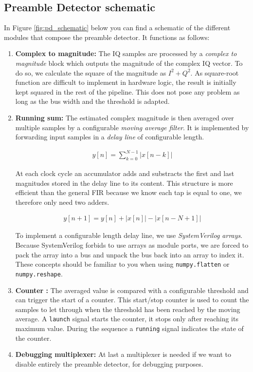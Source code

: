 \subsection{Preamble Detector schematic}
In Figure \ref{fig:pd_schematic} below you can find a schematic of the different modules that compose the preamble detector. It functions as follows:
\begin{enumerate}
    \item \textbf{Complex to magnitude: } The IQ samples are processed by a \textit{complex to magnitude} block which outputs the magnitude of the complex IQ vector.
    To do so, we calculate the square of the magnitude as $I^2+Q^2$. As square-root function are difficult to implement in hardware logic, the result is initially kept squared in the rest of the pipeline. This does not pose any problem as long as the bus width and the threshold is adapted.
    
    \item \textbf{Running sum: } The estimated complex magnitude is then averaged over multiple samples by a configurable \textit{moving average filter}. It is implemented by forwarding input samples in a \textit{delay line} of configurable length.

    \begin{align}
            y[n] = \sum_{k=0}^{N-1}\left|x[n-k]\right|
    \end{align}
        
    At each clock cycle an accumulator adds and substracts the first and last magnitudes stored in the delay line to its content. This structure is more efficient than the general FIR because we know each tap is equal to one, we therefore only need two adders.
        
    \begin{align}
            y[n+1] = y[n] + \left|x[n]\right| - \left|x[n-N+1]\right|
    \end{align}
        
    To implement a configurable length delay line, we use \textit{SystemVerilog arrays}. Because SystemVerilog forbids to use arrays as module ports, we are forced to pack the array into a bus and unpack the bus back into an array to index it. These concepts should be familiar to you when using \texttt{numpy.flatten} or \texttt{numpy.reshape}. 
    
    \item \textbf{Counter :} The averaged value is compared with a configurable threshold and can trigger the start of a counter. This start/stop counter is used to count the samples to let through when the threshold has been reached by the moving average. A \texttt{launch} signal starts the counter, it stops only after reaching its maximum value. During the sequence a \texttt{running} signal indicates the state of the counter.
    
    \item \textbf{Debugging multiplexer: }At last a multiplexer is needed if we want to disable entirely the preamble detector, for debugging purposes. 

\end{enumerate}


